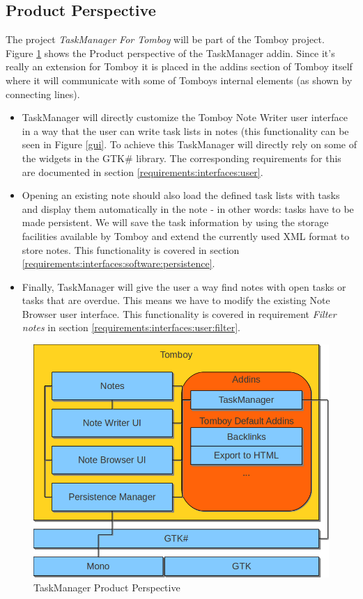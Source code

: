 \subsection{Product Perspective}
\label{description:perspective}
  The project \textit{TaskManager For Tomboy} will be part of the Tomboy project.\\
  Figure \ref{perspective} shows the Product perspective of the TaskManager addin. Since it's really an extension for Tomboy it is placed in
  the addins section of Tomboy itself where it will communicate with some of Tomboys internal elements (as shown by connecting lines).
  \begin{itemize}
    \item TaskManager will directly customize the Tomboy Note Writer user interface in a way that the user can write task lists in notes 
	(this functionality can be seen in Figure \ref{gui}. To achieve this TaskManager will  directly rely on some of the 
	widgets in the GTK\# library. The corresponding requirements for this are documented in section \ref{requirements:interfaces:user}.
    \item Opening an existing note should also load the defined task lists with tasks and display them automatically in the note - in other words:
    tasks have to be made persistent.
	We  will save the task information by using the storage facilities available by Tomboy and extend
    the currently used XML  format to store notes. This functionality is covered in section \ref{requirements:interfaces:software:persistence}.
    \item Finally, TaskManager will give the user a way find notes with open tasks or tasks that are overdue. This means we have to modify
    the existing Note Browser user interface. This functionality is covered in requirement \textit{Filter notes} in section \ref{requirements:interfaces:user:filter}.
  \end{itemize}


  \begin{figure}[ht]
    \includegraphics[width=\textwidth]{graphics/product_perspective_diagram.png}
    \caption{TaskManager Product Perspective}
    \label{perspective}
  \end{figure}


